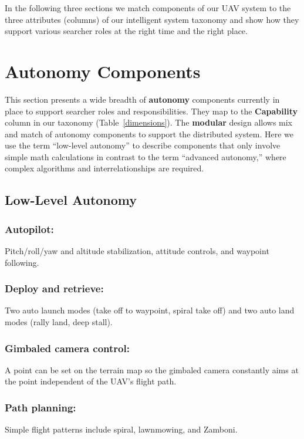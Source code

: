 \documentclass[letterpaper]{article}
\begin{document}
In the following three sections we match components of our UAV system to the three attributes (columns) of our intelligent system taxonomy and show how they support various searcher roles at the right time and the right place.



\section{Autonomy Components}

This section presents a wide breadth of \textbf{autonomy} components currently in place to support searcher roles and responsibilities. They map to the \textbf{Capability} column in our taxonomy (Table~\ref{dimensions}). The \textbf{modular} design allows mix and match of autonomy components to support the distributed system. Here we use the term ``low-level autonomy'' to describe components that only involve simple math calculations in contrast to the term ``advanced autonomy,'' where complex algorithms and interrelationships are required.

\subsection{Low-Level Autonomy}

\subsubsection{Autopilot:} Pitch/roll/yaw and altitude stabilization, attitude controls, and waypoint following.
\subsubsection{Deploy and retrieve:} Two auto launch modes (take off to waypoint, spiral take off) and two auto land modes (rally land, deep stall).
\subsubsection{Gimbaled camera control:} A point can be set on the terrain map so the gimbaled camera constantly aims at the point independent of the UAV's flight path.
\subsubsection{Path planning:} Simple flight patterns include spiral, lawnmowing, and Zamboni.
\end{document}
